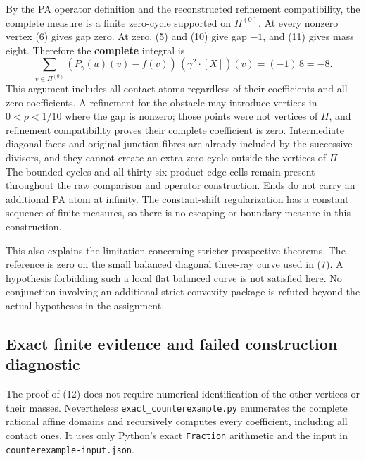 \documentclass[
  10pt,
]{article}
\begin{document}
By the PA operator definition and the reconstructed refinement
compatibility, the complete measure is a finite zero-cycle supported on
\(\Pi^{(0)}\). At every nonzero vertex (6) gives gap zero. At zero, (5)
and (10) give gap \(-1\), and (11) gives mass eight. Therefore the
\textbf{complete} integral is \[
 \sum_{v\in\Pi^{(0)}}(P_\gamma(u)(v)-f(v))\,
                           (\gamma^2\cdot[X])(v)
                    =(-1)\,8=-8.
 \tag{12}
\] This argument includes all contact atoms regardless of their
coefficients and all zero coefficients. A refinement for the obstacle
may introduce vertices in \(0<\rho<1/10\) where the gap is nonzero;
those points were not vertices of \(\Pi\), and refinement compatibility
proves their complete coefficient is zero. Intermediate diagonal faces
and original junction fibres are already included by the successive
divisors, and they cannot create an extra zero-cycle outside the
vertices of \(\Pi\). The bounded cycles and all thirty-six product edge
cells remain present throughout the raw comparison and operator
construction. Ends do not carry an additional PA atom at infinity. The
constant-shift regularization has a constant sequence of finite
measures, so there is no escaping or boundary measure in this
construction.

This also explains the limitation concerning stricter prospective
theorems. The reference is zero on the small balanced diagonal three-ray
curve used in (7). A hypothesis forbidding such a local flat balanced
curve is not satisfied here. No conjunction involving an additional
strict-convexity package is refuted beyond the actual hypotheses in the
assignment.

\subsection{Exact finite evidence and failed construction
diagnostic}\label{exact-finite-evidence-and-failed-construction-diagnostic}

The proof of (12) does not require numerical identification of the other
vertices or their masses. Nevertheless \texttt{exact\_counterexample.py}
enumerates the complete rational affine domains and recursively computes
every coefficient, including all contact ones. It uses only Python's
exact \texttt{Fraction} arithmetic and the input in
\texttt{counterexample-input.json}.
\end{document}
